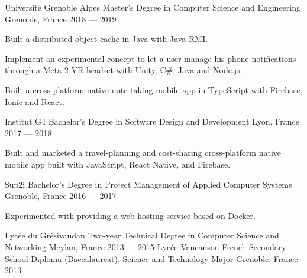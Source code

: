 

\begin{cventries}

  \cventry
    {Université Grenoble Alpes} %
    {Master's Degree in Computer Science and Engineering} %
    {Grenoble, France} %
    {2018 — 2019} %
    {
      \begin{cvitems} %
        \item {Built a distributed object cache in Java with Java RMI.}
        \item {Implement an experimental concept to let a user manage his phone notifications through a Meta 2 VR headset with Unity, C\#, Java and Node.js.}
        \item {Built a cross-platform native note taking mobile app in TypeScript with Firebase, Ionic and React.}
      \end{cvitems}
    }
  \cventry
    {Institut G4} %
    {Bachelor's Degree in Software Design and Development} %
    {Lyon, France} %
    {2017 — 2018} %
    {
      \begin{cvitems} %
        \item {Built and marketed a travel-planning and cost-sharing cross-platform native mobile app built with JavaScript, React Native, and Firebase.}
      \end{cvitems}
    }
  \cventry
    {Sup2i} %
    {Bachelor's Degree in Project Management of Applied Computer Systems} %
    {Grenoble, France} %
    {2016 — 2017} %
    {
      \begin{cvitems} %
        \item {Experimented with providing a web hosting service based on Docker.}
      \end{cvitems}
    }
  \cventryy
    {Lycée du Grésivaudan} %
    {Two-year Technical Degree in Computer Science and Networking} %
    {Meylan, France} %
    {2013 — 2015} %
  \cventryy
    {Lycée Vaucanson} %
    {French Secondary School Diploma (Baccalauréat), Science and Technology Major} %
    {Grenoble, France} %
    {2013} %
\end{cventries}
